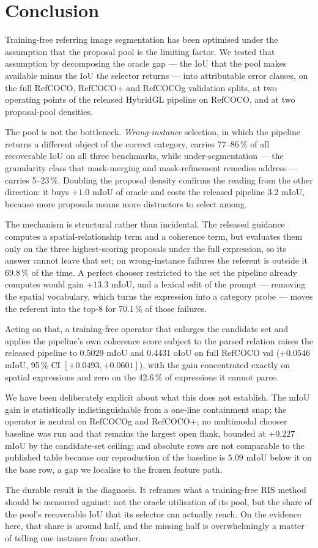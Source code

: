 \section{Conclusion}

Training-free referring image segmentation has been optimised under the
assumption that the proposal pool is the limiting factor. We tested that
assumption by decomposing the oracle gap --- the IoU that the pool makes
available minus the IoU the selector returns --- into attributable error
classes, on the full RefCOCO, RefCOCO$+$ and RefCOCOg validation splits, at two
operating points of the released HybridGL pipeline on RefCOCO, and at two
proposal-pool densities.

The pool is not the bottleneck. \emph{Wrong-instance} selection, in which the
pipeline returns a different object of the correct category, carries 77--86\,\%
of all recoverable IoU on all three benchmarks, while
under-segmentation --- the granularity class that mask-merging and
mask-refinement remedies address --- carries 5--23\,\%. Doubling the proposal
density confirms the reading from the other direction: it buys $+1.0$ mIoU of
oracle and costs the released pipeline $3.2$ mIoU, because more proposals means
more distractors to select among.

The mechanism is structural rather than incidental. The released guidance
computes a spatial-relationship term and a coherence term, but evaluates them
only on the three highest-scoring proposals under the full expression, so its
answer cannot leave that set; on wrong-instance failures the referent is
outside it 69.8\,\% of the time. A perfect chooser restricted to the set the
pipeline already computes would gain $+13.3$ mIoU, and a lexical edit of the
prompt --- removing the spatial vocabulary, which turns the expression into a
category probe --- moves the referent into the top-8 for 70.1\,\% of those
failures.

Acting on that, a training-free operator that enlarges the candidate set and
applies the pipeline's own coherence score subject to the parsed relation
raises the released pipeline to 0.5029 mIoU and 0.4431 oIoU on full RefCOCO val
($+0.0546$ mIoU, 95\,\% CI $[+0.0493,+0.0601]$), with the gain concentrated
exactly on spatial expressions and zero on the 42.6\,\% of expressions it
cannot parse.

We have been deliberately explicit about what this does not establish. The
mIoU gain is statistically indistinguishable from a one-line containment snap;
the operator is neutral on RefCOCOg and RefCOCO$+$; no multimodal chooser
baseline was run and that remains the largest open flank, bounded at $+0.227$
mIoU by the candidate-set ceiling; and absolute rows are not comparable to the
published table because our reproduction of the baseline is $5.09$ mIoU below
it on the base row, a gap we localise to the frozen feature path.

The durable result is the diagnosis. It reframes what a training-free RIS
method should be measured against: not the oracle utilisation of its pool, but
the share of the pool's recoverable IoU that its selector can actually reach.
On the evidence here, that share is around half, and the missing half is
overwhelmingly a matter of telling one instance from another.
